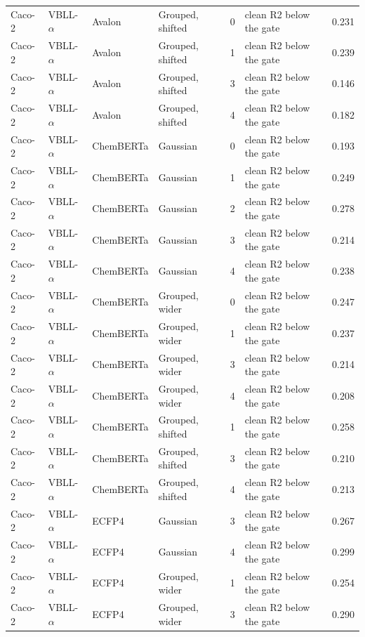 {\begin{longtable}{llllcll}
Caco-2 & VBLL-$\alpha$ & Avalon & Grouped, shifted & 0 & clean R2 below the gate & 0.231 \\
Caco-2 & VBLL-$\alpha$ & Avalon & Grouped, shifted & 1 & clean R2 below the gate & 0.239 \\
Caco-2 & VBLL-$\alpha$ & Avalon & Grouped, shifted & 3 & clean R2 below the gate & 0.146 \\
Caco-2 & VBLL-$\alpha$ & Avalon & Grouped, shifted & 4 & clean R2 below the gate & 0.182 \\
Caco-2 & VBLL-$\alpha$ & ChemBERTa & Gaussian & 0 & clean R2 below the gate & 0.193 \\
Caco-2 & VBLL-$\alpha$ & ChemBERTa & Gaussian & 1 & clean R2 below the gate & 0.249 \\
Caco-2 & VBLL-$\alpha$ & ChemBERTa & Gaussian & 2 & clean R2 below the gate & 0.278 \\
Caco-2 & VBLL-$\alpha$ & ChemBERTa & Gaussian & 3 & clean R2 below the gate & 0.214 \\
Caco-2 & VBLL-$\alpha$ & ChemBERTa & Gaussian & 4 & clean R2 below the gate & 0.238 \\
Caco-2 & VBLL-$\alpha$ & ChemBERTa & Grouped, wider & 0 & clean R2 below the gate & 0.247 \\
Caco-2 & VBLL-$\alpha$ & ChemBERTa & Grouped, wider & 1 & clean R2 below the gate & 0.237 \\
Caco-2 & VBLL-$\alpha$ & ChemBERTa & Grouped, wider & 3 & clean R2 below the gate & 0.214 \\
Caco-2 & VBLL-$\alpha$ & ChemBERTa & Grouped, wider & 4 & clean R2 below the gate & 0.208 \\
Caco-2 & VBLL-$\alpha$ & ChemBERTa & Grouped, shifted & 1 & clean R2 below the gate & 0.258 \\
Caco-2 & VBLL-$\alpha$ & ChemBERTa & Grouped, shifted & 3 & clean R2 below the gate & 0.210 \\
Caco-2 & VBLL-$\alpha$ & ChemBERTa & Grouped, shifted & 4 & clean R2 below the gate & 0.213 \\
Caco-2 & VBLL-$\alpha$ & ECFP4 & Gaussian & 3 & clean R2 below the gate & 0.267 \\
Caco-2 & VBLL-$\alpha$ & ECFP4 & Gaussian & 4 & clean R2 below the gate & 0.299 \\
Caco-2 & VBLL-$\alpha$ & ECFP4 & Grouped, wider & 1 & clean R2 below the gate & 0.254 \\
Caco-2 & VBLL-$\alpha$ & ECFP4 & Grouped, wider & 3 & clean R2 below the gate & 0.290 \\

\end{longtable}}
